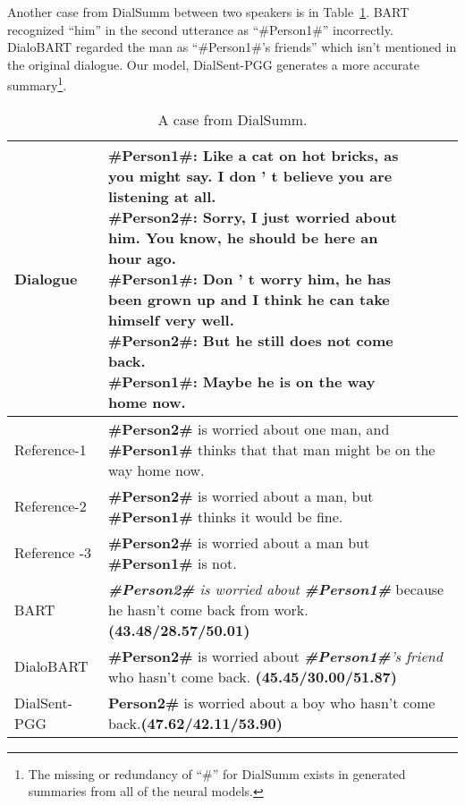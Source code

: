 Another case from DialSumm between two speakers is in Table~\ref{tab:case3}. BART recognized ``him'' in the second utterance as ``\#Person1\#'' incorrectly. DialoBART regarded the man as ``\#Person1\#'s friends'' which isn't mentioned in the original dialogue.  Our model, DialSent-PGG generates a more accurate summary\footnote{The missing or redundancy of ``\#'' for DialSumm exists in generated summaries from all of the neural models.}. 

\begin{table}[ht]
	\small
	\centering
	\begin{tabular}{lp{5cm}}
	\toprule[1pt]
	{Dialogue} & \makecell[l]{\textbf{\#Person1\#}: Like a cat on hot bricks, as \\you might say. I don ' t believe you are\\ listening at all.\\ \textbf{\#Person2\#}: Sorry, I just worried about\\ him. You know, he should be here an \\hour ago. \\ \textbf{\#Person1\#}: Don ' t worry him, he has \\been grown up and I think he can take\\ himself very well. \\ \textbf{\#Person2\#}: But he still does not come\\ back. \\ \textbf{\#Person1\#}: Maybe he is on the way\\ home now.
	} \\
	
	\hline
	{Reference-1} & \textbf{\#Person2\#} is worried about one man, and \textbf{\#Person1\#} thinks that that man might be on the way home now. \\
	\hline
	{Reference-2} & \textbf{\#Person2\#} is worried about a man, but \textbf{\#Person1\#} thinks it would be fine.\\
	\hline
	{Reference -3} &\textbf{\#Person2\#} is worried about a man but \textbf{\#Person1\#} is not.\\
	\hline
	{BART} & \textit{ \textbf{\#Person2\#} is worried about \textbf{\#Person1\#} }because he hasn't come back from work. \textbf{(43.48/28.57/50.01)} \\
	\hline
	{DialoBART} &  \textbf{\#Person2\#} is worried about \textit{\textbf{\#Person1\#}'s friend }who hasn't come back. \textbf{(45.45/30.00/51.87)} \\
	\hline
	{DialSent-PGG} & \textbf{Person2\#} is worried about a boy who hasn't come back.\textbf{(47.62/42.11/53.90)}\\
	\bottomrule[1pt]
	\end{tabular}
	\caption{A case from DialSumm.}
\label{tab:case3}
\end{table}






